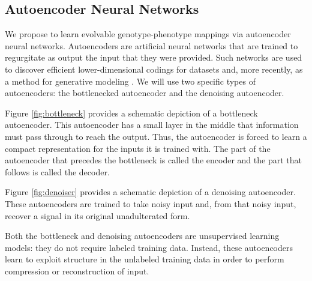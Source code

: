\subsection{Autoencoder Neural Networks}

We propose to learn evolvable genotype-phenotype mappings via autoencoder neural networks.
Autoencoders are artificial neural networks that are trained to regurgitate as output the input that they were provided.
Such networks are used to discover efficient lower-dimensional codings for datasets and, more recently, as a method for generative modeling \cite{liou2014autoencoder, kingma2013auto}.
We will use two specific types of autoencoders: the bottlenecked autoencoder and the denoising autoencoder.



Figure \ref{fig:bottleneck} provides a schematic depiction of a bottleneck autoencoder.
This autoencoder has a small layer in the middle that information must pass through to reach the output.
Thus, the autoencoder is forced to learn a compact representation for the inputs it is trained with.
The part of the autoencoder that precedes the bottleneck is called the encoder and the part that follows is called the decoder.

Figure \ref{fig:denoiser} provides a schematic depiction of a denoising autoencoder.
These autoencoders are trained to take noisy input and, from that noisy input, recover a signal in its original unadulterated form.

Both the bottleneck and denoising autoencoders are unsupervised learning models: they do not require labeled training data.
Instead, these autoencoders learn to exploit structure in the unlabeled training data in order to perform compression or reconstruction of input.
